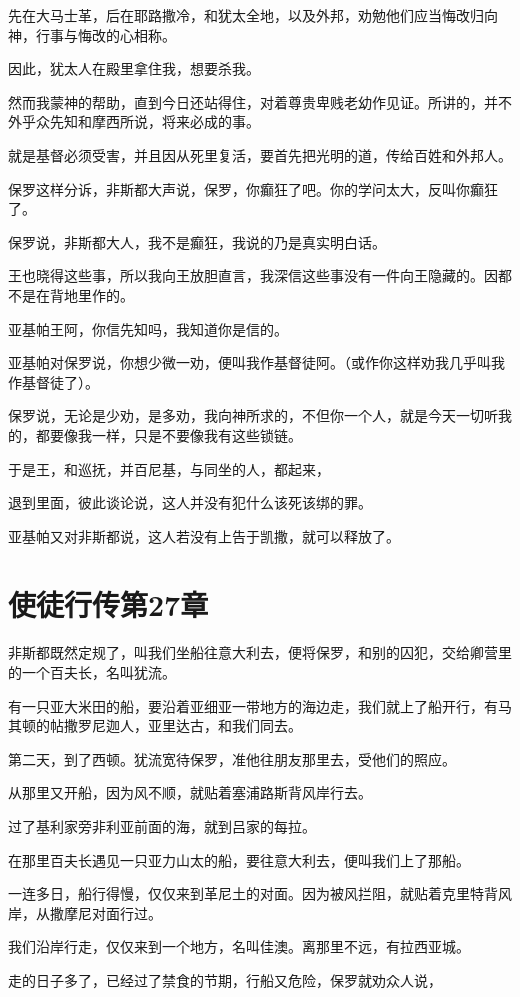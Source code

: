 \documentclass[12pt,oneside]{book}
\begin{document}
先在大马士革，后在耶路撒冷，和犹太全地，以及外邦，劝勉他们应当悔改归向神，行事与悔改的心相称。

因此，犹太人在殿里拿住我，想要杀我。

然而我蒙神的帮助，直到今日还站得住，对着尊贵卑贱老幼作见证。所讲的，并不外乎众先知和摩西所说，将来必成的事。

就是基督必须受害，并且因从死里复活，要首先把光明的道，传给百姓和外邦人。

保罗这样分诉，非斯都大声说，保罗，你癫狂了吧。你的学问太大，反叫你癫狂了。

保罗说，非斯都大人，我不是癫狂，我说的乃是真实明白话。

王也晓得这些事，所以我向王放胆直言，我深信这些事没有一件向王隐藏的。因都不是在背地里作的。

亚基帕王阿，你信先知吗，我知道你是信的。

亚基帕对保罗说，你想少微一劝，便叫我作基督徒阿。（或作你这样劝我几乎叫我作基督徒了）。

保罗说，无论是少劝，是多劝，我向神所求的，不但你一个人，就是今天一切听我的，都要像我一样，只是不要像我有这些锁链。

于是王，和巡抚，并百尼基，与同坐的人，都起来，

退到里面，彼此谈论说，这人并没有犯什么该死该绑的罪。

亚基帕又对非斯都说，这人若没有上告于凯撒，就可以释放了。

\chapter{使徒行传第27章}
非斯都既然定规了，叫我们坐船往意大利去，便将保罗，和别的囚犯，交给卿营里的一个百夫长，名叫犹流。

有一只亚大米田的船，要沿着亚细亚一带地方的海边走，我们就上了船开行，有马其顿的帖撒罗尼迦人，亚里达古，和我们同去。

第二天，到了西顿。犹流宽待保罗，准他往朋友那里去，受他们的照应。

从那里又开船，因为风不顺，就贴着塞浦路斯背风岸行去。

过了基利家旁非利亚前面的海，就到吕家的每拉。

在那里百夫长遇见一只亚力山太的船，要往意大利去，便叫我们上了那船。

一连多日，船行得慢，仅仅来到革尼土的对面。因为被风拦阻，就贴着克里特背风岸，从撒摩尼对面行过。

我们沿岸行走，仅仅来到一个地方，名叫佳澳。离那里不远，有拉西亚城。

走的日子多了，已经过了禁食的节期，行船又危险，保罗就劝众人说，
\end{document}
